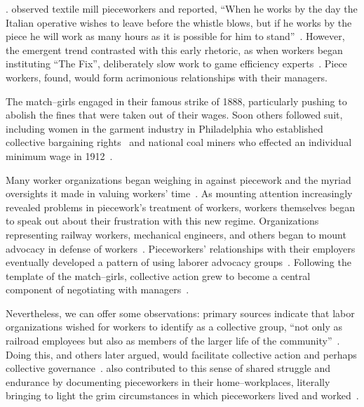 \documentclass[pn4226]{subfiles}
\begin{document}
.
\citeauthor{clark1908cotton} observed textile mill pieceworkers and reported,
``When he works by the day the Italian operative wishes to leave before the whistle blows,
but if he works by the piece he will work as many hours as it is possible for him to stand''~\cite{clark1908cotton}.
However, the emergent trend contrasted with this early rhetoric, as
when workers began instituting ``The Fix'', deliberately slow work to game efficiency experts~\cite{roy1954efficiency}.
Piece workers, \citeauthor{roy1954efficiency} found, would form acrimonious relationships with their managers.

The match--girls engaged in their famous strike of 1888, particularly pushing to abolish the fines that were taken out of their wages.
Soon others followed suit, including women in the garment industry in Philadelphia who established collective bargaining rights~\cite{10.2307/41829256} and national coal miners who effected an individual minimum wage in 1912~\cite{10.2307/2221944}.


Many worker organizations began weighing in against
piecework and the myriad oversights it made in valuing workers' time~\cite{american1921problem,richards1904anything}.
As mounting attention increasingly revealed problems in piecework's treatment of workers,
workers themselves began to speak out about their frustration with this new regime.
Organizations representing
railway workers,
mechanical engineers, and
others began to mount advocacy in defense of workers~\cite{american1921problem,richards1904anything}.
Pieceworkers' relationships with their employers eventually developed a pattern of using 
laborer advocacy groups~\cite{levi2009union,ahlquist2013interest,mccallum2013global,jacoby1983union}.
Following the template of the match--girls, collective action grew to become a central component of negotiating with managers~\cite{russell1982collective,olsonlogic}.

Nevertheless, we can offer some observations:
primary sources indicate that labor organizations wished for workers to identify as a collective group, 
``not only as railroad employees but also as members of the larger life of the community''~\cite{american1921problem}.
Doing this, 
\citeauthor{ostrom1990governing} and others later argued,
would facilitate collective action and perhaps collective governance~\cite{ostrom1990governing,russell1982collective,olsonlogic}.
\citeauthor{riisOtherSideLives} also contributed to this sense of shared struggle and endurance
by documenting pieceworkers in their home--workplaces,
literally bringing to light the grim circumstances in which pieceworkers lived and worked~\cite{riisOtherSideLives}.
\end{document}
